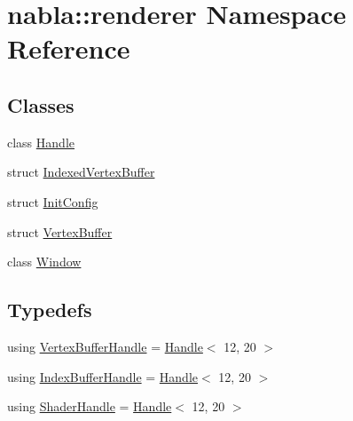 \hypertarget{namespacenabla_1_1renderer}{}\section{nabla\+::renderer Namespace Reference}
\label{namespacenabla_1_1renderer}
\subsection*{Classes}
\begin{DoxyCompactItemize}
\item 
class \mbox{\hyperlink{classnabla_1_1renderer_1_1_handle}{Handle}}
\item 
struct \mbox{\hyperlink{structnabla_1_1renderer_1_1_indexed_vertex_buffer}{Indexed\+Vertex\+Buffer}}
\item 
struct \mbox{\hyperlink{structnabla_1_1renderer_1_1_init_config}{Init\+Config}}
\item 
struct \mbox{\hyperlink{structnabla_1_1renderer_1_1_vertex_buffer}{Vertex\+Buffer}}
\item 
class \mbox{\hyperlink{classnabla_1_1renderer_1_1_window}{Window}}
\end{DoxyCompactItemize}
\subsection*{Typedefs}
\begin{DoxyCompactItemize}
\item 
using \mbox{\hyperlink{namespacenabla_1_1renderer_aa901f31283abb372f2a5ca3b90e09f54}{Vertex\+Buffer\+Handle}} = \mbox{\hyperlink{classnabla_1_1renderer_1_1_handle}{Handle}}$<$ 12, 20 $>$
\item 
using \mbox{\hyperlink{namespacenabla_1_1renderer_a6c2d393ca75aa2575fca09b5ef8bda55}{Index\+Buffer\+Handle}} = \mbox{\hyperlink{classnabla_1_1renderer_1_1_handle}{Handle}}$<$ 12, 20 $>$
\item 
using \mbox{\hyperlink{namespacenabla_1_1renderer_a351c881c3df21186064938743d67dd85}{Shader\+Handle}} = \mbox{\hyperlink{classnabla_1_1renderer_1_1_handle}{Handle}}$<$ 12, 20 $>$
\end{DoxyCompactItemize}
